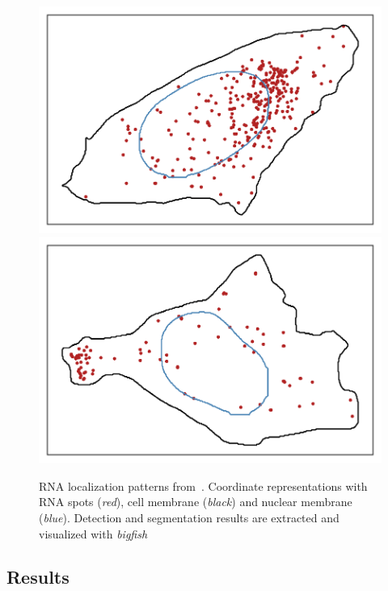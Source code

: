 \begin{figure}[h]
	\endminipage\hfill
		\includegraphics[trim={0.5cm 0.5cm 0.5cm 0.5cm},clip,width=\linewidth]{figures/chapter5/plot_perinuclear}
	\endminipage\hfill
		\includegraphics[trim={0.5cm 0.5cm 0.5cm 0.5cm},clip,width=\linewidth]{figures/chapter5/plot_protrusion}
	\endminipage
	\caption{RNA localization patterns from~\cite{CHOUAIB_2020}.
	Coordinate representations with RNA spots (\textit{red}), cell membrane (\textit{black}) and nuclear membrane (\textit{blue}).
	Detection and segmentation results are extracted and visualized with \emph{bigfish}}
	\label{fig:localization_patterns_racha_features}
\end{figure}

\subsection{Results}
\label{subsec:results_general_pattern}

